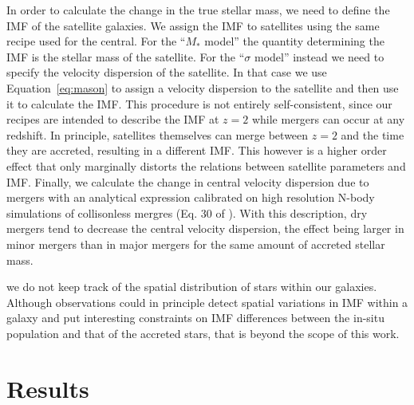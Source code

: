 \documentclass[usenatbib, letters]{mnras}
\def\Eref#1{Equation~\ref{#1}\xspace}
\begin{document}
In order to calculate the change in the true stellar mass, we need to define the IMF of the satellite galaxies. We assign the IMF to satellites using the same recipe used for the central. For the ``$M_*$ model'' the quantity determining the IMF is the stellar mass of the satellite. For the ``$\sigma$ model'' instead we need to specify the velocity dispersion of the satellite. In that case we use \Eref{eq:mason} to assign a velocity dispersion to the satellite and then use it to calculate the IMF.
This procedure is not entirely self-consistent, since our recipes are intended to describe the IMF at $z=2$ while mergers can occur at any redshift. In principle, satellites themselves can merge between $z=2$ and the time they are accreted, resulting in a different IMF. This however is a higher order effect that only marginally distorts the relations between satellite parameters and IMF. 
Finally, we calculate the change in central velocity dispersion due to mergers with an analytical expression calibrated on high resolution N-body simulations of collisonless mergres (Eq. 30 of \citet{Nip++12}). 
With this description, dry mergers tend to decrease the central velocity dispersion, the effect being larger in minor mergers than in major mergers for the same amount of accreted stellar mass.

we do not keep track of the spatial distribution of stars within our galaxies. Although observations could in principle detect spatial variations in IMF within a galaxy and put interesting constraints on IMF differences between the in-situ population and that of the accreted stars, that is beyond the scope of this work.

\section{Results}\label{sect:results}
\end{document}
